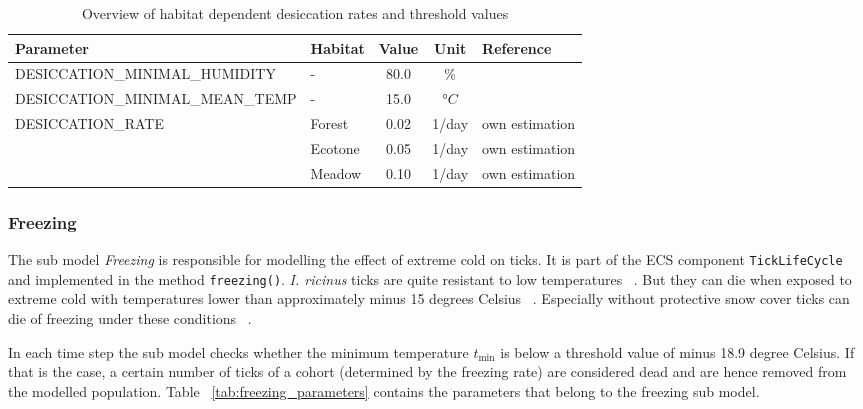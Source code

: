 \documentclass[a4paper, 11pt]{scrartcl}
\newcommand{\inlinecode}[1]{\texttt{\small #1}}
\begin{document}
\begin{table}[h!]
\caption[Overview of habitat-dependent desiccation rates and threshold values.]{Overview of habitat dependent desiccation rates and threshold values}
\label{tab:desiccation_parameters}
\begin{tabularx}{\textwidth}{llccl}
\toprule
\textbf{Parameter}							& \textbf{Habitat}  & \textbf{Value} & \textbf{Unit}	& \textbf{Reference} \\
\midrule
\multirow{3}{*}{\tiny{DESICCATION\_MINIMAL\_HUMIDITY}} 	& \multirow{3}{*}{-} & \multirow{3}{*}{80.0} & \multirow{3}{*}{\%} &  \textcite{Medlock.2013} \\
													   	& 					 & 						 &					   &  \textcite{Gray.2016}	\\
														& 					 & 						 &					   &  \textcite{Hauser.2018} \\
\tiny{DESICCATION\_MINIMAL\_MEAN\_TEMP} 	& -    			 		 &   15.0  & $°C$  &  \cite{Ostfeld.2015} \\
\multirow{3}{*}{\tiny{DESICCATION\_RATE}}  	& Forest       			 &   0.02  & 1/day 	& own estimation \\
				 							& Ecotone 				 &   0.05  & 1/day  & own estimation \\
				 							& Meadow    			 &   0.10  & 1/day  & own estimation \\
\bottomrule
\end{tabularx}
\end{table}

\subsubsection{Freezing}
The sub model \emph{Freezing} is responsible for modelling the effect of extreme cold on ticks. It is part of the ECS component \inlinecode{TickLifeCycle} and implemented in the method \inlinecode{freezing()}. \emph{I. ricinus} ticks are quite resistant to low temperatures ~\parencite{Gray.2009}. But they can die when exposed to extreme cold with temperatures lower than approximately minus 15 degrees Celsius ~\parencite{Ostfeld.2015}. Especially without protective snow cover ticks can die of freezing under these conditions ~\parencite{Jore.2014}.

In each time step the sub model checks whether the minimum temperature $t_{\min}$ is below a threshold value of minus 18.9 degree Celsius. If that is the case, a certain number of ticks of a cohort (determined by the freezing rate) are considered dead and are hence removed from the modelled population. Table ~\ref{tab:freezing_parameters} contains the parameters that belong to the freezing sub model.
\end{document}
